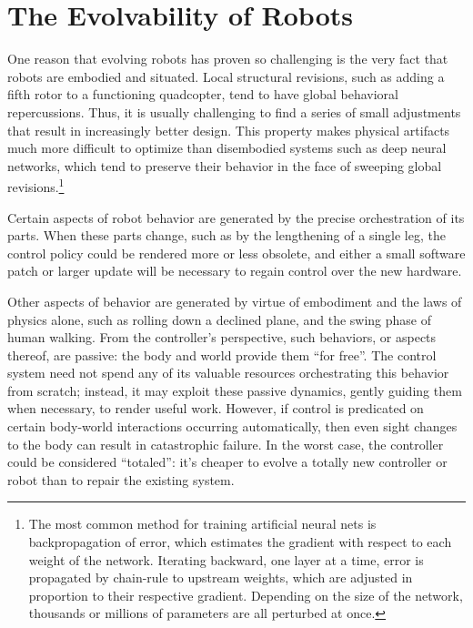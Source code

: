 


\section{The Evolvability of Robots}


One reason that evolving robots 
has proven so challenging is the very fact that robots are embodied and situated.
Local structural revisions, such as adding a fifth rotor to a functioning quadcopter, tend to have global behavioral repercussions.
Thus, it is usually challenging to find a series of small adjustments that result in increasingly better design. 
This property makes physical artifacts much more difficult to optimize than disembodied systems such as deep neural networks, which tend to preserve their behavior in the face of sweeping global revisions.\footnote{%
The most common method for training artificial neural nets is backpropagation of error, which
estimates the gradient with respect to each weight of the network.
Iterating backward, one layer at a time, error is propagated by chain-rule to upstream weights, which are adjusted in proportion to their respective gradient.
Depending on the size of the network, thousands or millions of parameters are all perturbed at once.%
}

Certain aspects of robot behavior are generated by the precise orchestration of its parts.
When these parts change, such as by the lengthening of a single leg, the control policy could be rendered more or less obsolete, and either a small software patch or larger update will be necessary to regain control over the new hardware.

Other aspects of behavior are generated by virtue of embodiment and the laws of physics alone, such as rolling down a declined plane, and the swing phase of human walking.
From the controller's perspective, such behaviors, or aspects thereof, are passive: the body and world provide them ``for free''.
The control system need not spend any of its valuable resources orchestrating this behavior from scratch; instead, it may exploit these passive dynamics, gently guiding them when necessary, to render useful work.
However, if control is predicated on certain body-world interactions occurring automatically, then even sight changes to the body can result in catastrophic failure.
In the worst case, the controller could be considered ``totaled'': it's cheaper to evolve a totally new controller or robot than to repair the existing system.

